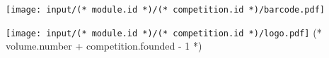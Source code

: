 \documentclass[12pt, oneside]{article}
\begin{document}
            
    \pagestyle{empty}
    \begin{center}
        \null
        \vfill
        \texttt{[image: input/(* module.id *)/(* competition.id *)/barcode.pdf]}
    \end{center}
    \newpage        
    \begin{center}
        \vspace*{20mm}
        \texttt{[image: input/(* module.id *)/(* competition.id *)/logo.pdf]}
        \vfill
        \fontsize{60}{25}\selectfont
        (* volume.number + competition.founded - 1 *)
    \end{center}
\end{document}

